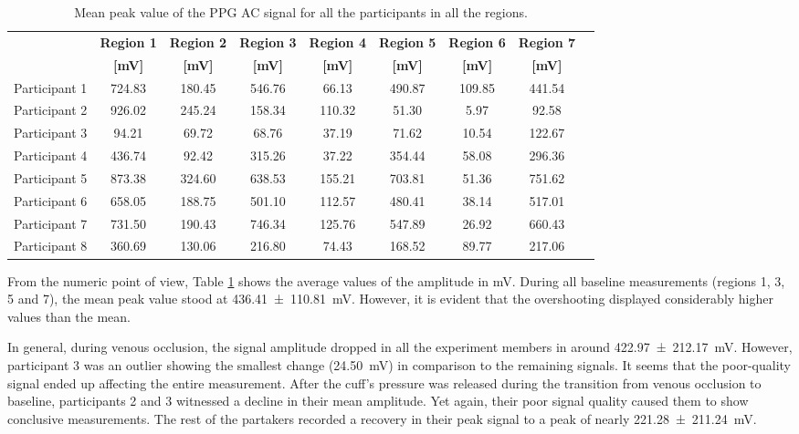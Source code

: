 \begin{table}[!htbp]
	\caption[Mean peak value of the PPG AC signal for all participants in all regions]{Mean peak value of the PPG AC signal for all the participants in all the regions.}
	\label{tbl:PPG RED-AC}
	\centering \small
	\begin{tabular}{p{1.9cm}cccccccc}
		\toprule
		& \textbf{Region 1}
		& \textbf{Region 2}
		& \textbf{Region 3}
		& \textbf{Region 4}
		& \textbf{Region 5}
		& \textbf{Region 6}
		& \textbf{Region 7} \\
		& \textbf{[\si{\milli\volt}]}
		& \textbf{[\si{\milli\volt}]}
		& \textbf{[\si{\milli\volt}]}		
		& \textbf{[\si{\milli\volt}]}		
		& \textbf{[\si{\milli\volt}]}
		& \textbf{[\si{\milli\volt}]}
		& \textbf{[\si{\milli\volt}]}\\\midrule
		Participant 1 & 724.83 & 180.45 & 546.76 &  66.13 & 490.87 & 109.85 & 441.54   \\  
		Participant 2 & 926.02 & 245.24 & 158.34 & 110.32 &  51.30 &   5.97 &  92.58   \\  
		Participant 3 &  94.21 &  69.72 &  68.76 &  37.19 &  71.62 &  10.54 & 122.67   \\  
		Participant 4 & 436.74 &  92.42 & 315.26 &  37.22 & 354.44 &  58.08 & 296.36   \\  
		Participant 5 & 873.38 & 324.60 & 638.53 & 155.21 & 703.81 &  51.36 & 751.62   \\  
		Participant 6 & 658.05 & 188.75 & 501.10 & 112.57 & 480.41 &  38.14 & 517.01   \\  
		Participant 7 & 731.50 & 190.43 & 746.34 & 125.76 & 547.89 &  26.92 & 660.43   \\  
		Participant 8 & 360.69 & 130.06 & 216.80 &  74.43 & 168.52 &  89.77 & 217.06   \\ 
		\bottomrule
	\end{tabular}
\end{table}

From the numeric point of view, Table \ref{tbl:PPG RED-AC} shows the average values of the amplitude in \si{\milli\volt}. During all baseline measurements (regions 1, 3, 5 and 7), the mean peak value stood at \SI{436.41(11081)}{\milli\volt}. However, it is evident that the overshooting displayed considerably higher values than the mean.  

In general, during venous occlusion, the signal amplitude dropped in all the experiment members in around \SI{422.97(21217)}{\milli\volt}. However, participant 3 was an outlier showing the smallest change (\SI{24.50}{\milli\volt}) in comparison to the remaining signals.  It seems that the poor-quality signal ended up affecting the entire measurement. After the cuff's pressure was released during the transition from venous occlusion to baseline, participants 2 and 3 witnessed a decline in their mean amplitude. Yet again, their poor signal quality caused them to show conclusive measurements. The rest of the partakers recorded a recovery in their peak signal to a peak of nearly \SI{221.28(21124)}{\milli\volt}. 

